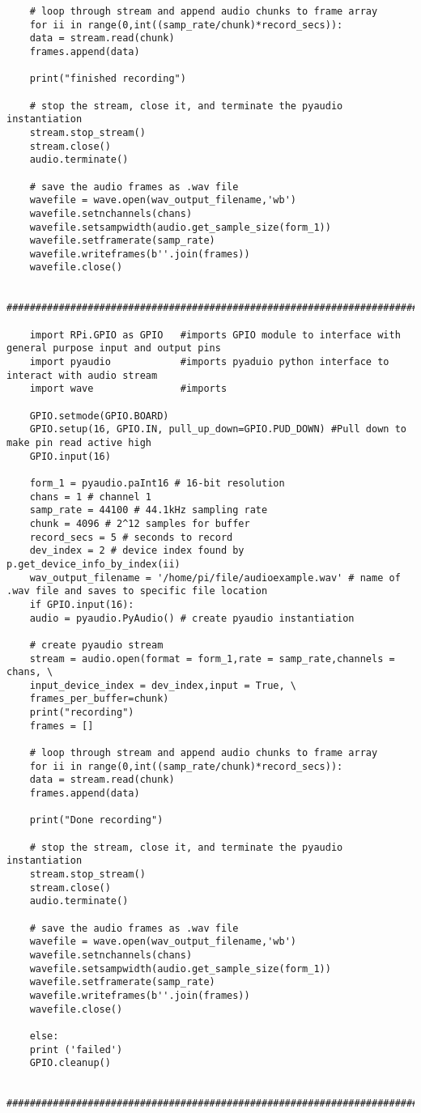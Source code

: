 \begin{lstlisting}
	# loop through stream and append audio chunks to frame array
	for ii in range(0,int((samp_rate/chunk)*record_secs)):
	data = stream.read(chunk)
	frames.append(data)
	
	print("finished recording")
	
	# stop the stream, close it, and terminate the pyaudio instantiation
	stream.stop_stream()
	stream.close()
	audio.terminate()
	
	# save the audio frames as .wav file
	wavefile = wave.open(wav_output_filename,'wb')
	wavefile.setnchannels(chans)
	wavefile.setsampwidth(audio.get_sample_size(form_1))
	wavefile.setframerate(samp_rate)
	wavefile.writeframes(b''.join(frames))
	wavefile.close()
	
	####################################################################################################
	
	import RPi.GPIO as GPIO   #imports GPIO module to interface with general purpose input and output pins
	import pyaudio            #imports pyaduio python interface to interact with audio stream
	import wave				  #imports 
	
	GPIO.setmode(GPIO.BOARD)
	GPIO.setup(16, GPIO.IN, pull_up_down=GPIO.PUD_DOWN) #Pull down to make pin read active high
	GPIO.input(16)
	
	form_1 = pyaudio.paInt16 # 16-bit resolution
	chans = 1 # channel 1
	samp_rate = 44100 # 44.1kHz sampling rate
	chunk = 4096 # 2^12 samples for buffer
	record_secs = 5 # seconds to record
	dev_index = 2 # device index found by p.get_device_info_by_index(ii)
	wav_output_filename = '/home/pi/file/audioexample.wav' # name of .wav file and saves to specific file location
	if GPIO.input(16):
	audio = pyaudio.PyAudio() # create pyaudio instantiation
	
	# create pyaudio stream
	stream = audio.open(format = form_1,rate = samp_rate,channels = chans, \
	input_device_index = dev_index,input = True, \
	frames_per_buffer=chunk)
	print("recording")
	frames = []
	
	# loop through stream and append audio chunks to frame array
	for ii in range(0,int((samp_rate/chunk)*record_secs)):
	data = stream.read(chunk)
	frames.append(data)
	
	print("Done recording")
	
	# stop the stream, close it, and terminate the pyaudio instantiation
	stream.stop_stream()
	stream.close()
	audio.terminate()
	
	# save the audio frames as .wav file
	wavefile = wave.open(wav_output_filename,'wb')
	wavefile.setnchannels(chans)
	wavefile.setsampwidth(audio.get_sample_size(form_1))
	wavefile.setframerate(samp_rate)
	wavefile.writeframes(b''.join(frames))
	wavefile.close()
	
	else:
	print ('failed')
	GPIO.cleanup()
	
	####################################################################################################
	
	
	\end{lstlisting}
